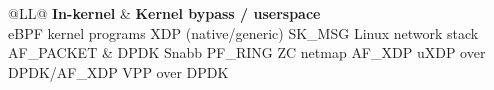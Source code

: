 \documentclass[11pt,a4paper]{article}
\begin{document}
\begin{table}[!t]
\centering
\small
\begin{tabularx}{\textwidth}{@{}LL@{}}
\toprule
\textbf{In-kernel} & \textbf{Kernel bypass / userspace} \\
\midrule
eBPF kernel programs \cite{xdp2018,freitas2022,tu2021}\newline
\hspace*{1em}XDP (native/generic) \cite{xdp2018,tu2021}\newline
\hspace*{1em}SK\_MSG \cite{middlenet2023}\newline
Linux network stack \cite{xdp2018,tu2021,ara2020}\newline
\hspace*{1em}AF\_PACKET \cite{valia2026}
&
DPDK \cite{gallenmueller2015,metronome2023,valia2026,tu2021,ara2020}\newline
Snabb \cite{ara2020}\newline
PF\_RING ZC \cite{gallenmueller2015}\newline
netmap \cite{gallenmueller2015}\newline
AF\_XDP \cite{mole2025,edge2023,valia2026,tu2021}\newline
uXDP over DPDK/AF\_XDP \cite{uxdp2025}\newline
VPP over DPDK \cite{ara2020} \\
\bottomrule
\end{tabularx}
\end{table}
\end{document}
